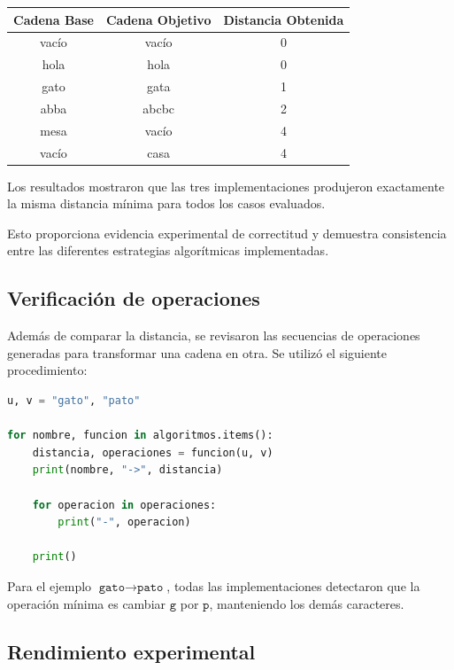 \documentclass[12pt]{article}
\begin{document}
\begin{center}
    \begin{tabular}{|c|c|c|}
        \hline
        Cadena Base & Cadena Objetivo & Distancia Obtenida \\
        \hline
        vacío & vacío & 0 \\
        \hline
        hola & hola & 0 \\
        \hline
        gato & gata & 1 \\
        \hline
        abba & abcbc & 2 \\
        \hline
        mesa & vacío & 4 \\
        \hline
        vacío & casa & 4 \\
        \hline
    \end{tabular}
\end{center}

Los resultados mostraron que las tres implementaciones produjeron exactamente la misma distancia mínima para todos los casos evaluados.

Esto proporciona evidencia experimental de correctitud y demuestra consistencia entre las diferentes estrategias algorítmicas implementadas.


\subsection*{Verificación de operaciones}

Además de comparar la distancia, se revisaron las secuencias de operaciones generadas para transformar una cadena en otra. Se utilizó el siguiente procedimiento:

\begin{lstlisting}[language=Python]
u, v = "gato", "pato"

for nombre, funcion in algoritmos.items():
    distancia, operaciones = funcion(u, v)
    print(nombre, "->", distancia)

    for operacion in operaciones:
        print("-", operacion)

    print()
\end{lstlisting}

Para el ejemplo \(\texttt{gato} \rightarrow \texttt{pato}\), todas las implementaciones detectaron que la operación mínima es cambiar \(\texttt{g}\) por \(\texttt{p}\), manteniendo los demás caracteres.

\newpage
\subsection*{Rendimiento experimental}
\end{document}
